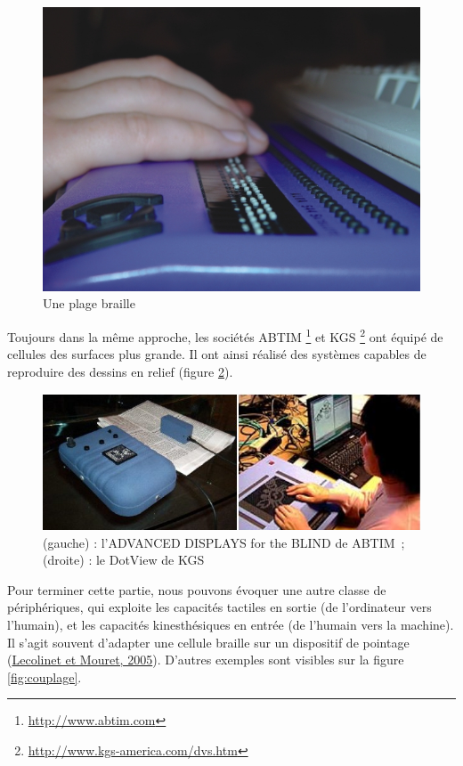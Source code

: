 \documentclass[
]{book}
\begin{document}
\begin{figure}
\centering
\includegraphics{img/braille-1.jpg}
\caption{\label{fig:plagebraille}Une plage braille}
\end{figure}

Toujours dans la même approche, les sociétés ABTIM \footnote{\url{http://www.abtim.com}} et
KGS \footnote{\url{http://www.kgs-america.com/dvs.htm}} ont équipé de cellules des surfaces
plus grande. Il ont ainsi réalisé des systèmes capables de reproduire des
dessins en relief (figure \ref{fig:tactiledisplay}).

\begin{figure}
\centering
\includegraphics{img/tactileDisplay.jpg}
\caption{\label{fig:tactiledisplay}(gauche) : l'ADVANCED DISPLAYS for the BLIND de ABTIM~;
(droite) : le DotView de KGS}
\end{figure}

Pour terminer cette partie, nous pouvons évoquer une autre classe de
périphériques, qui exploite les capacités tactiles en sortie (de l'ordinateur
vers l'humain), et les capacités kinesthésiques en entrée (de l'humain vers
la machine). Il s'agit souvent d'adapter une cellule braille sur un
dispositif de pointage (\href{047-bibliographie.html\#Lecolinet2005}{Lecolinet et
Mouret, 2005}). D'autres exemples sont visibles sur la
figure \ref{fig:couplage}.
\end{document}
